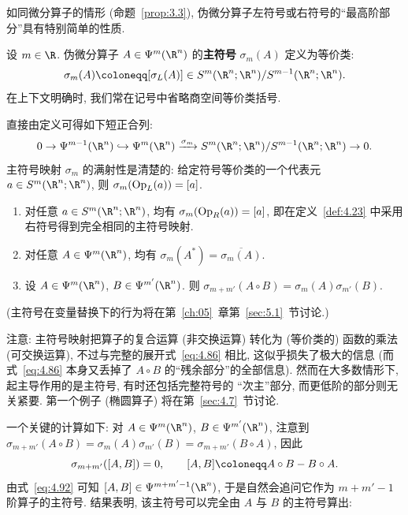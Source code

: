 如同微分算子的情形 (命题~\ref{prop:3.3}), 伪微分算子左符号或右符号的``最高阶部分''具有特别简单的性质.

\begin{definition}[伪微分算子的主符号]\label{def:4.23}
设 $m \in \R$. 伪微分算子 $A \in \Psi^m(\R^n)$ 的\textbf{主符号} $\sigma_m(A)$ 定义为等价类:
\begin{equation}\label{eq:4.91}
    \sigma_m(A) \defeq [\sigma_L(A)] \in S^m(\R^n; \R^n) / S^{m-1}(\R^n; \R^n).
\end{equation}
在上下文明确时, 我们常在记号中省略商空间等价类括号.
\end{definition}

直接由定义可得如下短正合列:
\begin{equation}\label{eq:4.92}
    0 \to \Psi^{m-1}(\R^n) \hookrightarrow \Psi^m(\R^n) \xrightarrow{\sigma_m} S^m(\R^n; \R^n) / S^{m-1}(\R^n; \R^n) \to 0.
\end{equation}
主符号映射 $\sigma_m$ 的满射性是清楚的: 给定符号等价类的一个代表元 $a \in S^m(\R^n; \R^n)$, 则 $\sigma_m(\operatorname{Op}_L(a)) = [a]$.

\begin{proposition}[主符号的代数性质]\label{prop:4.24}
\begin{enumerate}
    \item 对任意 $a \in S^m(\R^n; \R^n)$, 均有 $\sigma_m(\operatorname{Op}_R(a)) = [a]$, 即在定义~\ref{def:4.23} 中采用右符号得到完全相同的主符号映射.
    \item 对任意 $A \in \Psi^m(\R^n)$, 均有 $\sigma_m(A^*) = \overline{\sigma_m(A)}$.
    \item 设 $A \in \Psi^m(\R^n)$, $B \in \Psi^{m'}(\R^n)$. 则 $\sigma_{m+m'}(A \circ B) = \sigma_m(A) \sigma_{m'}(B)$.
\end{enumerate}
(主符号在变量替换下的行为将在第~\ref{ch:05}~章第~\ref{sec:5.1}~节讨论.)
\end{proposition}

注意: 主符号映射把算子的复合运算 (非交换运算) 转化为 (等价类的) 函数的乘法 (可交换运算),
不过与完整的展开式~\eqref{eq:4.86} 相比, 这似乎损失了极大的信息 (而式~\eqref{eq:4.86} 本身又丢掉了
$A \circ B$ 的``残余部分''的全部信息). 然而在大多数情形下, 起主导作用的是主符号, 有时还包括完整符号的
``次主''部分, 而更低阶的部分则无关紧要. 第一个例子 (椭圆算子) 将在第~\ref{sec:4.7}~节讨论.

一个关键的计算如下: 对 $A \in \Psi^m(\R^n)$, $B \in \Psi^{m'}(\R^n)$, 注意到
$\sigma_{m+m'}(A \circ B) = \sigma_m(A) \sigma_{m'}(B) = \sigma_{m+m'}(B \circ A)$, 因此
\begin{equation}\label{eq:4.93}
    \sigma_{m+m'}([A, B]) = 0, \qquad [A, B] \defeq A \circ B - B \circ A.
\end{equation}
由式~\eqref{eq:4.92} 可知 $[A, B] \in \Psi^{m+m'-1}(\R^n)$, 于是自然会追问它作为 $m+m'-1$ 阶算子的主符号.
结果表明, 该主符号可以完全由 $A$ 与 $B$ 的主符号算出:

